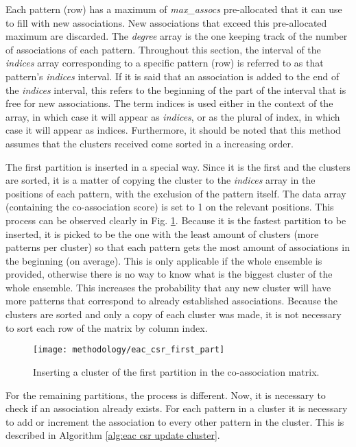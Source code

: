 Each pattern (row) has a maximum of \emph{max\_assocs} pre-allocated that it can use to fill with new associations.
New associations that exceed this pre-allocated maximum are discarded.
The \emph{degree} array is the one keeping track of the number of associations of each pattern.
Throughout this section, the interval of the \emph{indices} array corresponding to a specific pattern (row) is referred to as that pattern's \emph{indices} interval.
If it is said that an association is added to the end of the \emph{indices} interval, this refers to the beginning of the part of the interval that is free for new associations.
The term indices is used either in the context of the array, in which case it will appear as \emph{indices}, or as the plural of index, in which case it will appear as indices.
Furthermore, it should be noted that this method assumes that the clusters received come sorted in a increasing order.

The first partition is inserted in a special way.
Since it is the first and the clusters are sorted, it is a matter of copying the cluster to the \emph{indices} array in the positions of each pattern, with the exclusion of the pattern itself.
The data array (containing the co-association score) is set to 1 on the relevant positions.
This process can be observed clearly in Fig. \ref{fig:first part}.
Because it is the fastest partition to be inserted, it is picked to be the one with the least amount of clusters (more patterns per cluster) so that each pattern gets the most amount of associations in the beginning (on average).
This is only applicable if the whole ensemble is provided, otherwise there is no way to know what is the biggest cluster of the whole ensemble.
This increases the probability that any new cluster will have more patterns that correspond to already established associations.
Because the clusters are sorted and only a copy of each cluster was made, it is not necessary to sort each row of the matrix by column index.

\begin{figure}[hbtp]
\centering
\texttt{[image: methodology/eac\_csr\_first\_part]}
\caption{Inserting a cluster of the first partition in the co-association matrix.}
\label{fig:first part}
\end{figure}

For the remaining partitions, the process is different.
Now, it is necessary to check if an association already exists.
For each pattern in a cluster it is necessary to add or increment the association to every other pattern in the cluster.
This is described in Algorithm \ref{alg:eac csr update cluster}.


